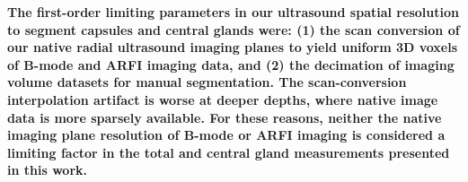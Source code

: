 \textbf{The first-order limiting parameters in our ultrasound spatial
resolution to segment capsules and central glands were: (1) the scan conversion
of our native radial ultrasound imaging planes to yield uniform 3D voxels of
B-mode and ARFI imaging data, and (2) the decimation of imaging volume datasets
for manual segmentation.  The scan-conversion interpolation artifact is worse
at deeper depths, where native image data is more sparsely available.  For
these reasons, neither the native imaging plane resolution of B-mode or ARFI
imaging is considered a limiting factor in the total and central gland
measurements presented in this work.}
